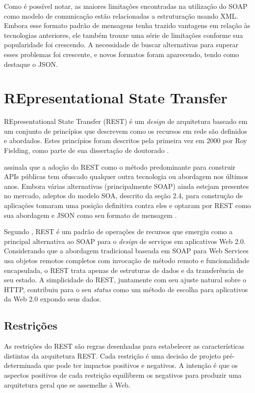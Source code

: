 Como é possível notar, as maiores limitações encontradas na utilização do SOAP como modelo de comunicação estão relacionadas a estruturação usando XML. Embora esse formato padrão de mensagens tenha trazido vantagens em relação às tecnologias anteriores, ele também trouxe uma série de limitações conforme sua popularidade foi crescendo. A necessidade de buscar alternativas para superar esses problemas foi crescente, e novos formatos foram aparecendo, tendo como destaque o JSON.

\section{REpresentational State Transfer}\label{sec:rest}

REpresentational State Transfer (REST) é um \textit{design} de arquitetura baseado em um conjunto de princípios que descrevem como os recursos em rede são definidos e abordados. Estes princípios foram descritos pela primeira vez em 2000 por Roy Fielding, como parte de sua dissertação de doutorado \cite{rest-intro}.

 assinala que a adoção do REST como o método predominante para construir APIs públicas tem ofuscado qualquer outra tecnologia ou abordagem nos últimos anos. Embora várias alternativas (principalmente SOAP) ainda estejam presentes no mercado, adeptos do modelo SOA, descrito da seção 2.4,  para construção de aplicações tomaram uma posição definitiva contra eles e optaram por REST como sua abordagem e JSON como seu formato de mensagem .

Segundo , REST é um padrão de operações de recursos que emergiu como a principal alternativa ao SOAP para o \textit{design} de serviços em aplicativos Web 2.0. Considerando que a abordagem tradicional baseada em SOAP para Web Services usa objetos remotos completos com invocação de método remoto e funcionalidade encapsulada, o REST trata apenas de estruturas de dados e da transferência de seu estado. A simplicidade do REST, juntamente com seu ajuste natural sobre o HTTP, contribuiu para o seu \textit{status} como um método de escolha para aplicativos da Web 2.0 expondo seus dados.

\subsection{Restrições}

As restrições do REST são regras desenhadas para estabelecer as características distintas da arquitetura REST. Cada restrição é uma decisão de projeto pré-determinada que pode ter impactos positivos e negativos. A intenção é que os aspectos positivos de cada restrição equilibrem os negativos para produzir uma arquitetura geral que se assemelhe à Web.

